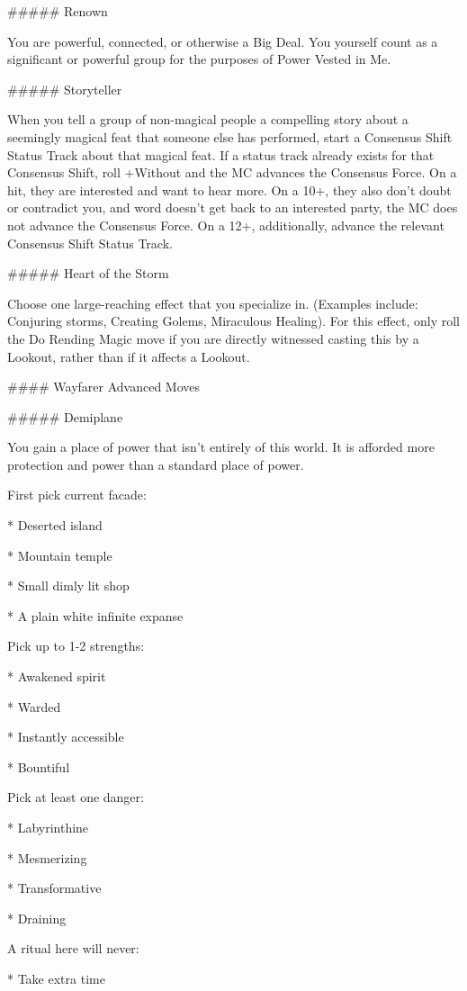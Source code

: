 \documentclass[
  oneside,
  statementpaper,
  9pt]{memoir}
\begin{document}
\begin{Player}
##### Renown

You are powerful, connected, or otherwise a Big Deal. You yourself count as a significant or powerful group for the purposes of Power Vested in Me.

##### Storyteller

When you tell a group of non-magical people a compelling story about a seemingly magical feat that someone else has performed, start a Consensus Shift Status Track about that magical feat. If a status track already exists for that Consensus Shift, roll +Without and the MC advances the Consensus Force. On a hit, they are interested and want to hear more. On a 10+, they also don’t doubt or contradict you, and word doesn’t get back to an interested party, the MC does not advance the Consensus Force. On a 12+, additionally, advance the relevant Consensus Shift Status Track.

##### Heart of the Storm

Choose one large-reaching effect that you specialize in. (Examples include: Conjuring storms, Creating Golems, Miraculous Healing). For this effect, only roll the Do Rending Magic move if you are directly witnessed casting this by a Lookout, rather than if it affects a Lookout.

#### Wayfarer Advanced Moves

##### Demiplane

You gain a place of power that isn’t entirely of this world. It is afforded more protection and power than a standard place of power.

First pick current facade:

* Deserted island

* Mountain temple

* Small dimly lit shop

* A plain white infinite expanse

Pick up to 1-2 strengths:

* Awakened spirit

* Warded

* Instantly accessible

* Bountiful

Pick at least one danger:

* Labyrinthine

* Mesmerizing

* Transformative

* Draining

A ritual here will never:

* Take extra time


\end{Player}
\end{document}
